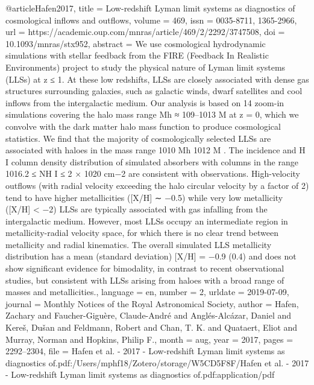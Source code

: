 {@article{Hafen2017,
	title = {Low-redshift {Lyman} limit systems as diagnostics of cosmological inflows and outflows},
	volume = {469},
	issn = {0035-8711, 1365-2966},
	url = {https://academic.oup.com/mnras/article/469/2/2292/3747508},
	doi = {10.1093/mnras/stx952},
	abstract = {We use cosmological hydrodynamic simulations with stellar feedback from the FIRE (Feedback In Realistic Environments) project to study the physical nature of Lyman limit systems (LLSs) at z ≤ 1. At these low redshifts, LLSs are closely associated with dense gas structures surrounding galaxies, such as galactic winds, dwarf satellites and cool inﬂows from the intergalactic medium. Our analysis is based on 14 zoom-in simulations covering the halo mass range Mh ≈ 109–1013 M at z = 0, which we convolve with the dark matter halo mass function to produce cosmological statistics. We ﬁnd that the majority of cosmologically selected LLSs are associated with haloes in the mass range 1010 Mh 1012 M . The incidence and H I column density distribution of simulated absorbers with columns in the range 1016.2 ≤ NH I ≤ 2 × 1020 cm−2 are consistent with observations. High-velocity outﬂows (with radial velocity exceeding the halo circular velocity by a factor of 2) tend to have higher metallicities ([X/H] ∼ −0.5) while very low metallicity ([X/H] {\textless} −2) LLSs are typically associated with gas infalling from the intergalactic medium. However, most LLSs occupy an intermediate region in metallicity-radial velocity space, for which there is no clear trend between metallicity and radial kinematics. The overall simulated LLS metallicity distribution has a mean (standard deviation) [X/H] = −0.9 (0.4) and does not show signiﬁcant evidence for bimodality, in contrast to recent observational studies, but consistent with LLSs arising from haloes with a broad range of masses and metallicities.},
	language = {en},
	number = {2},
	urldate = {2019-07-09},
	journal = {Monthly Notices of the Royal Astronomical Society},
	author = {Hafen, Zachary and Faucher-Giguère, Claude-André and Anglés-Alcázar, Daniel and Kereš, Dušan and Feldmann, Robert and Chan, T. K. and Quataert, Eliot and Murray, Norman and Hopkins, Philip F.},
	month = aug,
	year = {2017},
	pages = {2292--2304},
	file = {Hafen et al. - 2017 - Low-redshift Lyman limit systems as diagnostics of.pdf:/Users/mphf18/Zotero/storage/W5CD5F8F/Hafen et al. - 2017 - Low-redshift Lyman limit systems as diagnostics of.pdf:application/pdf}
}


}
